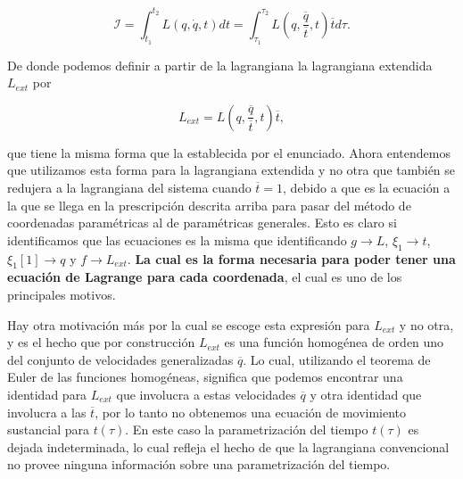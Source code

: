 \documentclass[a4paper,10pt]{article}
\numberwithin{equation}{section}
\begin{document}
\begin{equation}
 \mathcal{I} = \int_{t_1}^{t_2} L(q,\dot{q},t)dt = 
 \int_{\tau_1}^{\tau_2} L\left(q,\frac{\overline{q}}{\overline{t}},t\right)\overline{t}d\tau.
\end{equation}

De donde podemos definir a partir de la lagrangiana  
la lagrangiana extendida $L_{ext}$ por 

\begin{equation}
 L_{ext} = L(q,\frac{\overline{q}}{\overline{t}},t)\overline{t},
 \label{eq:6lagrangianaExt}
\end{equation}

que tiene la misma forma que la establecida por el enunciado. Ahora entendemos que 
utilizamos esta forma para la lagrangiana extendida y no otra que también se redujera
a la lagrangiana del sistema cuando $\overline{t} = 1$, debido  a que 
es la ecuación a la que se llega en la prescripción descrita arriba para pasar del método 
de coordenadas paramétricas al de paramétricas generales. Esto es claro si identificamos 
que las ecuaciones  es la misma que  
identificando $g\rightarrow L$, $\xi_1 \rightarrow t$, $\xi_1{[1]} \rightarrow q$ y 
$f \rightarrow L_{ext}$. \textbf{La cual es la forma necesaria para poder tener una ecuación 
de Lagrange para cada coordenada}, el cual es uno de los principales motivos. 

\vspace{.3cm}

Hay otra motivación más por la cual se escoge esta expresión para $L_{ext}$ y no otra,
y es el hecho que por construcción $L_{ext}$ es una función homogénea de orden uno 
del conjunto de velocidades generalizadas $\overline{q}$. Lo cual, utilizando 
el teorema de Euler de las funciones homogéneas, significa que podemos encontrar 
una identidad para $L_{ext}$ que involucra a estas velocidades $\overline{q}$ y otra
identidad que involucra a las $\overline{t}$, por lo tanto no obtenemos una ecuación 
de movimiento sustancial para $t(\tau)$. En este caso la parametrización del 
tiempo $t(\tau)$ es dejada indeterminada, lo cual refleja el hecho de que la lagrangiana 
convencional no provee ninguna información sobre una parametrización del tiempo.

\vspace{.3cm}
\end{document}
